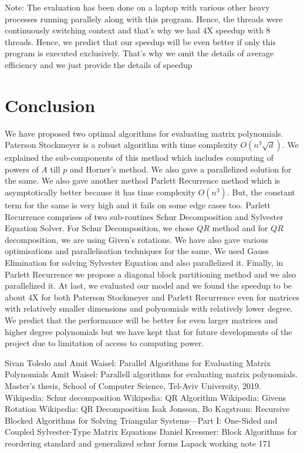 \documentclass[12pt,a4paper]{article}
\begin{document}
Note: The evaluation has been done on a laptop with various other heavy processes running parallely along with this program. Hence, the threads were continuously switching context and that's why we had 4X speedup with 8 threads. Hence, we predict that our speedup will be even better if only this program is executed exclusively. That's why we omit the details of average efficiency and we just provide the details of speedup 

\newpage
\section{Conclusion}

We have proposed two optimal algorithms for evaluating matrix polynomials. Paterson Stockmeyer is a robust algorithm with time complexity $O(n^3\sqrt{d})$. We explained the sub-components of this method which includes computing of powers of $A$ till $p$ and Horner's method. We also gave a parallelized solution for the same. We also gave another method Parlett Recurrence method which is asymptotically better because it has time complexity $O(n^3)$. But, the constant term for the same is very high and it fails on some edge cases too. Parlett Recurrence comprises of two sub-routines Schur Decomposition and Sylvester Equation Solver. For Schur Decomposition, we chose $QR$ method and for $QR$ decomposition, we are using Given's rotations. We have also gave various optimisations and parallelisation techniques for the same. We used Gauss Elimination for solving Sylvester Equation and also parallelized it. Finally, in Parlett Recurrence we propose a diagonal block partitioning method and we also parallelized it. At last, we evaluated our model and we found the speedup to be about 4X for both Paterson Stockmeyer and Parlett Recurrence even for matrices with relatively smaller dimensions and polynomials with relatively lower degree. We predict that the performance will be better for even larger matrices and higher degree polynomials but we have kept that for future developments of the project due to limitation of access to computing power.


\newpage




\begin{thebibliography}{9}
Sivan Toledo and Amit Waisel: Parallel Algorithms for Evaluating Matrix Polynomials
Amit Waisel: Parallell algorithms for evaluating matrix polynomials. Master’s
thesis, School of Computer Science, Tel-Aviv University, 2019.
Wikipedia: Schur decomposition
Wikipedia: QR Algorithm
Wikipedia: Givens Rotation
Wikipedia: QR Decomposition
Isak Jonsson, Bo Kagstrom: Recursive Blocked Algorithms for Solving Triangular Systems—Part I: One-Sided and Coupled Sylvester-Type Matrix Equations
Daniel Kressner: Block Algorithms for reordering standard and generalized schur forms Lapack working note 171

\end{thebibliography}
\end{document}
